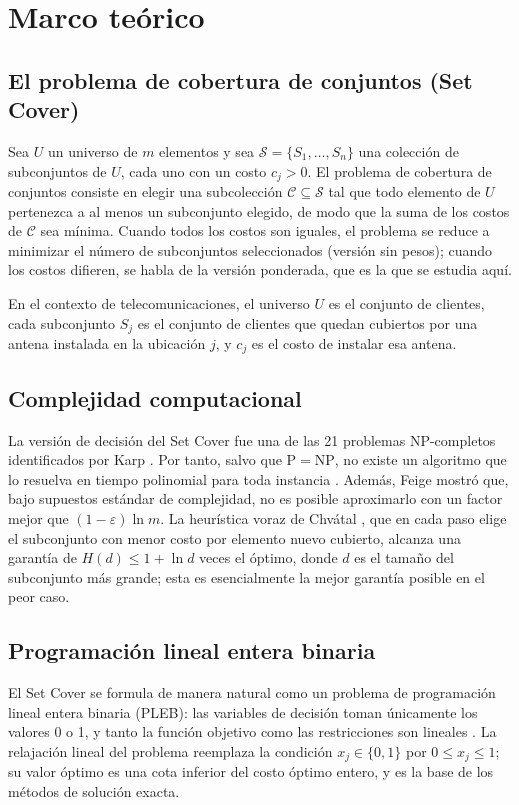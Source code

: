 \section{Marco teórico}

\subsection{El problema de cobertura de conjuntos (Set Cover)}
Sea $U$ un universo de $m$ elementos y sea $\mathcal{S}=\{S_1,\dots,S_n\}$ una colección de subconjuntos de $U$, cada uno con un costo $c_j>0$. El problema de cobertura de conjuntos consiste en elegir una subcolección $\mathcal{C}\subseteq\mathcal{S}$ tal que todo elemento de $U$ pertenezca a al menos un subconjunto elegido, de modo que la suma de los costos de $\mathcal{C}$ sea mínima. Cuando todos los costos son iguales, el problema se reduce a minimizar el número de subconjuntos seleccionados (versión sin pesos); cuando los costos difieren, se habla de la versión ponderada, que es la que se estudia aquí.

En el contexto de telecomunicaciones, el universo $U$ es el conjunto de clientes, cada subconjunto $S_j$ es el conjunto de clientes que quedan cubiertos por una antena instalada en la ubicación $j$, y $c_j$ es el costo de instalar esa antena.

\subsection{Complejidad computacional}
La versión de decisión del Set Cover fue una de las 21 problemas NP-completos identificados por Karp \cite{karp72}. Por tanto, salvo que $\mathrm{P}=\mathrm{NP}$, no existe un algoritmo que lo resuelva en tiempo polinomial para toda instancia \cite{garey79}. Además, Feige \cite{feige98} mostró que, bajo supuestos estándar de complejidad, no es posible aproximarlo con un factor mejor que $(1-\varepsilon)\ln m$. La heurística voraz de Chv\'atal \cite{chvatal79}, que en cada paso elige el subconjunto con menor costo por elemento nuevo cubierto, alcanza una garantía de $H(d)\le 1+\ln d$ veces el óptimo, donde $d$ es el tamaño del subconjunto más grande; esta es esencialmente la mejor garantía posible en el peor caso.

\subsection{Programación lineal entera binaria}
El Set Cover se formula de manera natural como un problema de programación lineal entera binaria (PLEB): las variables de decisión toman únicamente los valores 0 o 1, y tanto la función objetivo como las restricciones son lineales \cite{wolsey98}. La relajación lineal del problema reemplaza la condición $x_j\in\{0,1\}$ por $0\le x_j\le 1$; su valor óptimo es una cota inferior del costo óptimo entero, y es la base de los métodos de solución exacta.

